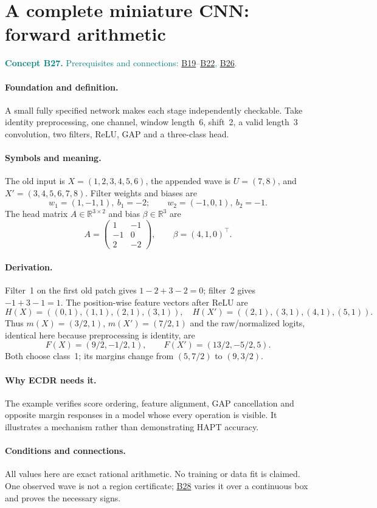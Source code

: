 \documentclass[11pt,a4paper]{article}
\newcommand{\R}{\mathbb R}
\newcommand{\conceptid}{Front matter}
\newcommand{\concept}[3]{\clearpage\renewcommand{\conceptid}{#1}%
\section{#2}\label{concept:#1}%
\textcolor{teal}{\textbf{Concept #1.} Prerequisites and connections: #3.}\par
\typeout{ECDR-CONCEPT-START #1 PAGE=\thepage}}
\begin{document}
\concept{B27}{A complete miniature CNN: forward arithmetic}{\hyperref[concept:B19]{B19}--\hyperref[concept:B22]{B22}, \hyperref[concept:B26]{B26}}
\paragraph{Foundation and definition.}
A small fully specified network makes each stage independently checkable.
Take identity preprocessing, one channel, window length~6, shift~2, a
valid length~3 convolution, two filters, ReLU, GAP and a three-class head.
\paragraph{Symbols and meaning.}
The old input is $X=(1,2,3,4,5,6)$, the appended wave is $U=(7,8)$,
and $X'=(3,4,5,6,7,8)$. Filter weights and biases are
\[
 w_1=(1,-1,1),\ b_1=-2;\qquad w_2=(-1,0,1),\ b_2=-1.
\]
The head matrix $A\in\R^{3\times2}$ and bias $\beta\in\R^3$ are
\[
 A=\begin{pmatrix}1&-1\\-1&0\\2&-2\end{pmatrix},\qquad
 \beta=(4,1,0)^\top.
\]
\paragraph{Derivation.}
Filter~1 on the first old patch gives $1-2+3-2=0$; filter~2 gives
$-1+3-1=1$. The position-wise feature vectors after ReLU are
\[
 H(X)=((0,1),(1,1),(2,1),(3,1)),\quad
 H(X')=((2,1),(3,1),(4,1),(5,1)).
\]
Thus $m(X)=(3/2,1)$, $m(X')=(7/2,1)$ and the raw/normalized logits,
identical here because preprocessing is identity, are
\[
 F(X)=(9/2,-1/2,1),\qquad F(X')=(13/2,-5/2,5).
\]
Both choose class~1; its margins change from $(5,7/2)$ to $(9,3/2)$.
\paragraph{Why ECDR needs it.}
The example verifies score ordering, feature alignment, GAP cancellation
and opposite margin responses in a model whose every operation is visible.
It illustrates a mechanism rather than demonstrating HAPT accuracy.
\paragraph{Conditions and connections.}
All values here are exact rational arithmetic. No training or data fit is
claimed. One observed wave is not a region certificate; \hyperref[concept:B28]{B28} varies it over
a continuous box and proves the necessary signs.
\par\label{endconcept:B27}
\end{document}
